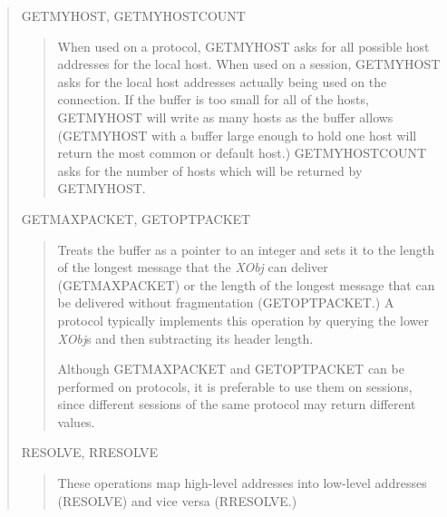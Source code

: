 \begin{quote}
	GETMYHOST, GETMYHOSTCOUNT
\begin{quote}
When used on a protocol, GETMYHOST asks for all possible host
addresses for the local host.  When used on a session, GETMYHOST asks
for the local host addresses actually being used on the connection.
If the buffer is too small for all of the hosts, GETMYHOST will write
as many hosts as the buffer allows (GETMYHOST with a buffer large
enough to hold one host will return the most common or default host.)
GETMYHOSTCOUNT asks for the number of hosts which will be returned by
GETMYHOST.

\end{quote}

	GETMAXPACKET, GETOPTPACKET
\begin{quote}

Treats the buffer as a pointer to an integer and sets it to the length
of the longest message that the {\em XObj} can deliver (GETMAXPACKET) or
the length of the longest message that can be delivered without
fragmentation (GETOPTPACKET.)  A protocol typically implements this
operation by querying the lower {\em XObj}s and then subtracting its
header length.  

\smallskip
Although GETMAXPACKET and GETOPTPACKET can be performed on protocols,
it is preferable to use them on sessions, since different sessions of
the same protocol may return different values.

\end{quote}

	RESOLVE, RRESOLVE
\begin{quote}

These operations map high-level addresses into low-level
addresses (RESOLVE) and vice versa (RRESOLVE.) 

\end{quote}
\end{quote}

